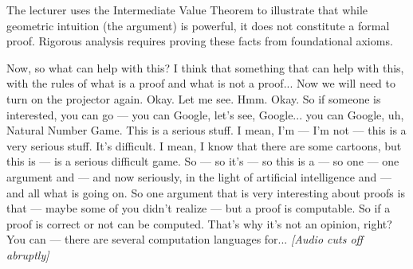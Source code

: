 \begin{math-stroke}
\begin{center}
\end{center}
\begin{explanation-of-steps}
The lecturer uses the Intermediate Value Theorem to illustrate that while geometric intuition (the  argument) is powerful, it does not constitute a formal proof. Rigorous analysis requires proving these  facts from foundational axioms.
\end{explanation-of-steps}
\end{math-stroke}

\begin{spoken-clean}[00:31:17 - 00:31:17]
Now, so what can help with this? I think that something that can help with this, with the rules of what is a proof and what is not a proof...  Now we will need to turn on the projector again. Okay. Let me see.  Hmm. Okay. So if someone is interested, you can go — you can Google, let's see, Google... you can Google, uh, Natural Number Game.  This is a serious stuff. I mean, I'm — I'm not — this is a very serious stuff. It's difficult. I mean, I know that there are some cartoons, but this is — is a serious difficult game. So — so it's — so this is a — so one — one argument and — and now seriously, in the light of artificial intelligence and — and all what is going on. So one argument that is very interesting about proofs is that — maybe some of you didn't realize — but a proof is computable. So if a proof is correct or not can be computed. That's why it's not an opinion, right? You can — there are several computation languages for... \textit{[Audio cuts off abruptly]}
\end{spoken-clean}

